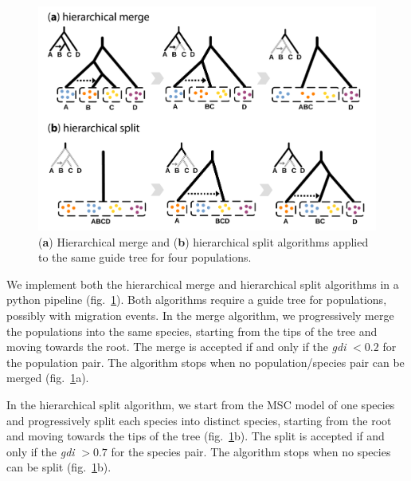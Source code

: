 \documentclass[A4]{article1}
\newcommand{\red}[1]{{\color{red}{#1}}}
\begin{document}
\begin{figure}
   \centering %
   \includegraphics[scale=0.25]{figs/fig-gdi-algorithms} %
   
   \caption{(\textbf{a}) Hierarchical merge and (\textbf{b}) hierarchical split
   algorithms applied to the same guide tree for four populations. \\%
   \red{[Prepare a version of the figure without gene flow using the same guide tree
      for merge and plit. \\ %
      Edit this version (with migration) to have the same guide tree for merge and
      split.  I suppose with migration it's not obvious how merge should work, but we
      can discuss options in relation to the issue of non-monophyletic species.]} %
} \label{fig:gdi-algorithms}
\end{figure}

We implement both the hierarchical merge and hierarchical split algorithms in a python
pipeline (fig.~\ref{fig:gdi-algorithms}).  Both algorithms require a guide tree for
populations, possibly with migration events.  In the merge algorithm, we progressively
merge the populations into the same species, starting from the tips of the tree and moving
towards the root.  The merge is accepted if and only if the \textit{gdi} $< 0.2$ for the
population pair.  The algorithm stops when no population/species pair can be merged
(fig.~\ref{fig:gdi-algorithms}a).

In the hierarchical split algorithm, we start from the MSC model of one species and
progressively split each species into distinct species, starting from the root and moving
towards the tips of the tree (fig.~\ref{fig:gdi-algorithms}b).  The split is accepted if and
only if the \textit{gdi} $> 0.7$ for the species pair.  The algorithm stops when no
species can be split (fig.~\ref{fig:gdi-algorithms}b).
\end{document}
